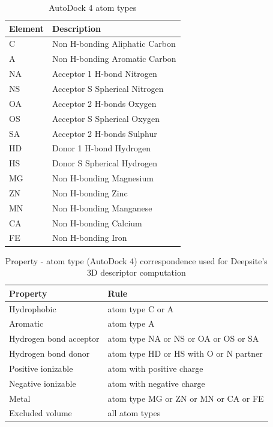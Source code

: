 \documentclass[10pt,a4paper,twoside]{book}
\begin{document}
 \begin{table}
\centering
\caption{AutoDock 4 atom types}
\label{table:autodockprop}
\begin{tabular}{@{}ll@{}}
\toprule
\textbf{Element} & \textbf{Description} \\ \midrule
C  & Non H-bonding Aliphatic Carbon     \\
A  & Non H-bonding Aromatic Carbon      \\
NA & Acceptor 1 H-bond Nitrogen         \\
NS & Acceptor S Spherical Nitrogen      \\
OA & Acceptor 2 H-bonds Oxygen          \\
OS & Acceptor S Spherical Oxygen        \\
SA & Acceptor 2 H-bonds Sulphur         \\
HD & Donor 1 H-bond Hydrogen            \\
HS & Donor S Spherical Hydrogen         \\
MG & Non H-bonding Magnesium            \\
ZN & Non H-bonding Zinc                 \\
MN & Non H-bonding Manganese            \\
CA & Non H-bonding Calcium              \\
FE & Non H-bonding Iron                 \\ \bottomrule
\end{tabular}
\end{table}


\begin{table}[!htb]
\centering
\caption{Property - atom type (AutoDock 4) correspondence used for Deepsite's 3D descriptor computation}
\label{table:corr}
\begin{tabular}{@{}ll@{}}
\toprule
\textbf{Property}      & \textbf{Rule}                          \\ \midrule
Hydrophobic            & atom type C or A                       \\
Aromatic               & atom type A                            \\
Hydrogen bond acceptor & atom type NA or NS or OA or OS or SA   \\
Hydrogen bond donor    & atom type HD or HS with O or N partner \\
Positive ionizable     & atom with positive charge              \\
Negative ionizable     & atom with negative charge              \\
Metal                  & atom type MG or ZN or MN or CA or FE   \\
Excluded volume        & all atom types                         \\ \bottomrule
\end{tabular}
\end{table}
\end{document}
